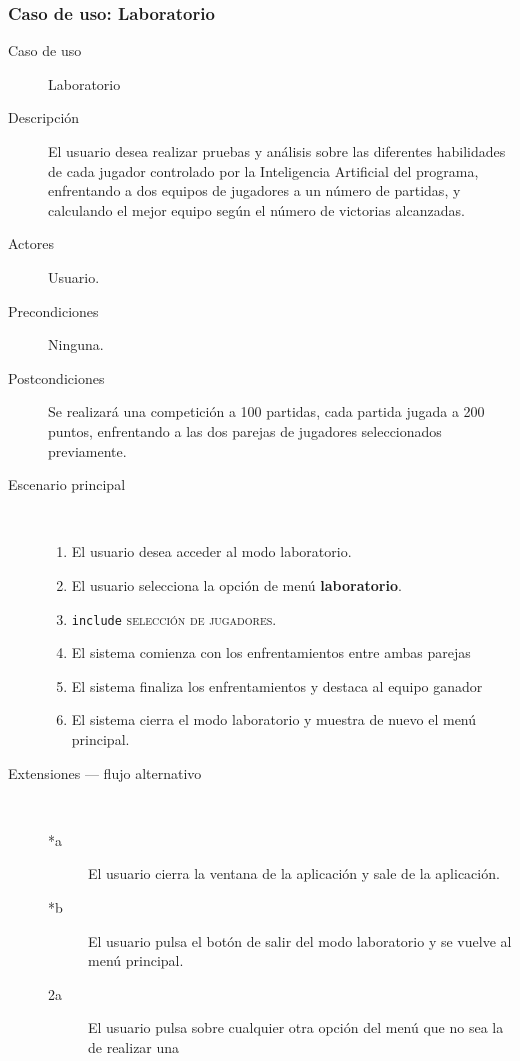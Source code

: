 \subsubsection{Caso de uso: Laboratorio}

\begin{description}
    \item[Caso de uso] Laboratorio
    \item[Descripción] El usuario desea realizar pruebas y análisis sobre las diferentes habilidades de cada jugador
            controlado por la Inteligencia Artificial del programa, enfrentando a dos equipos de jugadores a un 
            número de partidas, y calculando el mejor equipo según el número de victorias alcanzadas.
    \item[Actores] Usuario.
    \item[Precondiciones] Ninguna.
    \item[Postcondiciones] Se realizará una competición a 100 partidas, cada partida jugada a 200 puntos, enfrentando
            a las dos parejas de jugadores seleccionados previamente.
    \item[Escenario principal] $\quad$
        \begin{enumerate}
            \item El usuario desea acceder al modo laboratorio.
            \item El usuario selecciona la opción de menú \textbf{laboratorio}.
            \item \texttt{include} \textsc{selección de jugadores}.
            \item El sistema comienza con los enfrentamientos entre ambas parejas
            \item El sistema finaliza los enfrentamientos y destaca al equipo ganador
            \item El sistema cierra el modo laboratorio y muestra de nuevo el menú principal.
        \end{enumerate}
    \item[Extensiones --- flujo alternativo] $\quad$
        \begin{description}
            \item[*a ] El usuario cierra la ventana de la aplicación y sale de la aplicación.
            \item[*b ] El usuario pulsa el botón de salir del modo laboratorio y se vuelve al menú principal.
            \item[2a ] El usuario pulsa sobre cualquier otra opción del menú que no sea la de realizar una

\end{description}
\end{description}
